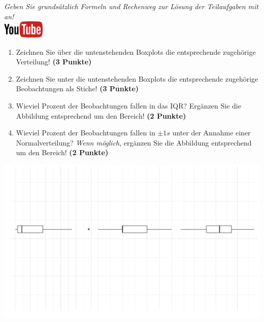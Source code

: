 \documentclass[a4paper, 9pt]{scrartcl}\usepackage[]{graphicx}\usepackage[]{xcolor}
\makeatletter
\def\maxwidth{ %
  \ifdim\Gin@nat@width>\linewidth
    \linewidth
  \else
    \Gin@nat@width
  \fi
}
\makeatother
\begin{document}
\textit{Geben Sie grunds{\"a}tzlich Formeln und Rechenweg zur L{\"o}sung der
  Teilaufgaben mit an!} \\[1Ex]

\hfill\href{https://youtu.be/Op-gjzASH9I}{\includegraphics[width =
  2cm]{img/youtube}}\\[1Ex]



\begin{enumerate}
\item Zeichnen Sie {\"u}ber die untenstehenden Boxplots die entsprechende
  zugeh{\"o}rige Verteilung! \textbf{(3 Punkte)} 
\item Zeichnen Sie unter die untenstehenden Boxplots die entsprechende
  zugeh{\"o}rige Beobachtungen als Stiche! \textbf{(3 Punkte)}
\item Wieviel Prozent der Beobachtungen fallen in das IQR? Erg{\"a}nzen Sie die
  Abbildung entsprechend um den Bereich! \textbf{(2 Punkte)}
\item Wieviel Prozent der Beobachtungen fallen in $\pm 1s$ unter
  der Annahme einer Normalverteilung?  \textit{Wenn m{\"o}glich}, erg{\"a}nzen Sie
  die Abbildung entsprechend um den Bereich! \textbf{(2 Punkte)}
\end{enumerate}




{\centering \includegraphics[width=\maxwidth]{img/desc-stat-11-1} 

}
\end{document}
